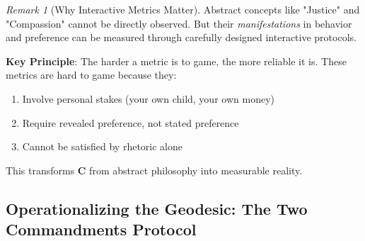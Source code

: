 \documentclass[11pt,a4paper]{article}
\theoremstyle{definition}
\theoremstyle{remark}
\newtheorem{remark}{Remark}[section]
\begin{document}
\begin{remark}[Why Interactive Metrics Matter]
Abstract concepts like "Justice" and "Compassion" cannot be directly observed. But their \textit{manifestations} in behavior and preference can be measured through carefully designed interactive protocols.

\textbf{Key Principle}: The harder a metric is to game, the more reliable it is. These metrics are hard to game because they:
\begin{enumerate}
    \item Involve personal stakes (your own child, your own money)
    \item Require revealed preference, not stated preference
    \item Cannot be satisfied by rhetoric alone
\end{enumerate}

This transforms \(\mathbf{C}\) from abstract philosophy into measurable reality.
\end{remark}

\subsection{Operationalizing the Geodesic: The Two Commandments Protocol}
\end{document}
